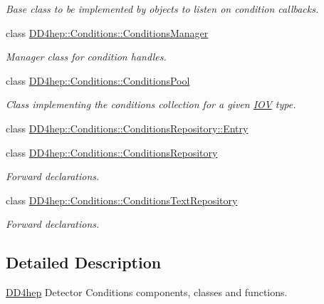 \begin{DoxyCompactItemize}
\begin{DoxyCompactList}\small\item\em Base class to be implemented by objects to listen on condition callbacks. \end{DoxyCompactList}\item 
class \hyperlink{class_d_d4hep_1_1_conditions_1_1_conditions_manager}{D\+D4hep\+::\+Conditions\+::\+Conditions\+Manager}
\begin{DoxyCompactList}\small\item\em Manager class for condition handles. \end{DoxyCompactList}\item 
class \hyperlink{class_d_d4hep_1_1_conditions_1_1_conditions_pool}{D\+D4hep\+::\+Conditions\+::\+Conditions\+Pool}
\begin{DoxyCompactList}\small\item\em Class implementing the conditions collection for a given \hyperlink{class_d_d4hep_1_1_i_o_v}{I\+OV} type. \end{DoxyCompactList}\item 
class \hyperlink{class_d_d4hep_1_1_conditions_1_1_conditions_repository_1_1_entry}{D\+D4hep\+::\+Conditions\+::\+Conditions\+Repository\+::\+Entry}
\item 
class \hyperlink{class_d_d4hep_1_1_conditions_1_1_conditions_repository}{D\+D4hep\+::\+Conditions\+::\+Conditions\+Repository}
\begin{DoxyCompactList}\small\item\em Forward declarations. \end{DoxyCompactList}\item 
class \hyperlink{class_d_d4hep_1_1_conditions_1_1_conditions_text_repository}{D\+D4hep\+::\+Conditions\+::\+Conditions\+Text\+Repository}
\begin{DoxyCompactList}\small\item\em Forward declarations. \end{DoxyCompactList}\end{DoxyCompactItemize}


\subsection{Detailed Description}
\hyperlink{namespace_d_d4hep}{D\+D4hep} Detector Conditions components, classes and functions. 


